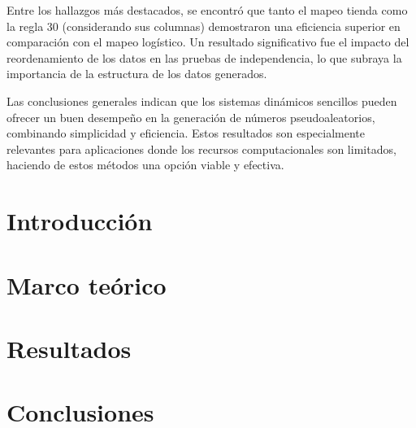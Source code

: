 \documentclass[letterpaper,spanish,12pt]{book}
\theoremstyle{remark}
\begin{document}
Entre los hallazgos más destacados, se encontró que tanto el mapeo tienda como la regla 30 (considerando sus columnas) demostraron una eficiencia superior en comparación con el mapeo logístico. Un resultado significativo fue el impacto del reordenamiento de los datos en las pruebas de independencia, lo que subraya la importancia de la estructura de los datos generados.

Las conclusiones generales indican que los sistemas dinámicos sencillos pueden ofrecer un buen desempeño en la generación de números pseudoaleatorios, combinando simplicidad y eficiencia. Estos resultados son especialmente relevantes para aplicaciones donde los recursos computacionales son limitados, haciendo de estos métodos una opción viable y efectiva.



\tableofcontents %
\mainmatter 
\chapter{Introducción}


\chapter{Marco teórico}


\chapter{Resultados}


% 

\chapter{Conclusiones}



% 
\end{document}
